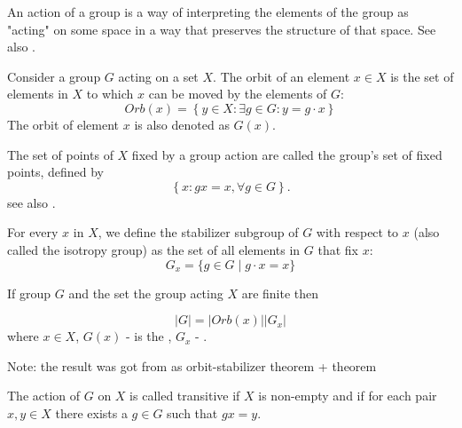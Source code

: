 \begin{appendices}
\begin{definition}[Action]
  An action of a group is a way of
  interpreting the elements of the 
  group as "acting" on some space in a way that preserves the structure
  of that space. See also \cite{wiki:groupaction}.
  \label{def:action}
\end{definition}

\begin{definition}[Orbit]
  Consider \cite{wiki:groupaction} a group $G$ acting on a set
  $X$. The orbit of an element $x \in X$ 
  is the set of elements in $X$ to which $x$ can be moved by the elements
  of $G$:
  \[
  Orb\left(x\right) = \left\{y \in X: \exists g \in G: y = g \cdot x \right\}
  \]
  The orbit of element $x$  is also denoted as $G\left(x\right)$.
  \label{def:orbit}
\end{definition}

\begin{definition}
  The set of points of $X$ fixed by a group action are called the
  group's set of fixed points, defined by
  \[
  \left\{
  x: g x = x, \forall g \in G
  \right\}.
  \]
  see also \cite{mathworld:groupfixedpoint}. 
  \label{def:fixedpoint}
\end{definition}

\begin{definition}
  For every $x$ in $X$, we define \cite{wiki:groupaction} the
  stabilizer subgroup of $G$ with 
  respect to $x$ (also called the isotropy group) as the set of all
  elements in $G$ that fix $x$: 
  \[
  G_{x}=\{g\in G\mid g\cdot x=x\}
  \]
  \label{def:stabilizersubgroup}
\end{definition}

\begin{theorem}
  If group $G$ and the set the group acting $X$ are finite then

  \[
  \left|G\right| = \left|Orb\left(x\right)\right|\left|G_x\right|
  \]
  where $x \in X$, $G\left(x\right)$ - is the ,
  $G_x$ - .
  
  Note: the result was got from \cite{wiki:groupaction} as
  orbit-stabilizer theorem +  theorem
  \label{thm:orbitstabilizertheorem}
\end{theorem}

\begin{definition}
  The action of $G$ on $X$ is called \cite{wiki:groupaction}
  transitive if $X$ is non-empty and if for each pair $x, y \in X$ there
  exists a $g \in G$ such that $gx = y$.
  \label{def:transitive}
\end{definition}


\end{appendices}
